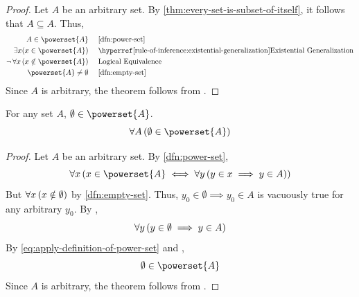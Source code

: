 \begin{proof}
    Let \( A \) be an arbitrary set. By \cref{thm:every-set-is-subset-of-itself}, it follows that
    \( A \subseteq A \). Thus,
    \begin{equation*}
        \begin{aligned}
            A \in \powerset{A}& \\
            \exists x ( x \in \powerset{A} )& \\
            \lnot \, \forall x \, ( x \notin \powerset{A} )&\\
            \powerset{A} \neq \emptyset&
        \end{aligned}
        \text{  }
        \begin{aligned}
            &\quad\text{\cref{dfn:power-set}}\\
            &\quad\text{\aref{rule-of-inference:existential-generalization}{Existential Generalization}}\\
            &\quad\text{Logical Equivalence}\\
            &\quad\text{\cref{dfn:empty-set}}\\
        \end{aligned}
    \end{equation*}
    Since \( A \) is arbitrary, the theorem follows from .
\end{proof}

\begin{thm}
    \label{thm:empty-set-belongs-to-the-powerset-of-any-set}
    For any set \( A \), \( \emptyset \in \powerset{A} \).
    \begin{equation*}
        \forall A \, \mleft( \emptyset \in \powerset{A} \mright)
    \end{equation*}
\end{thm}

\begin{proof}
    Let \( A \) be an arbitrary set. By \cref{dfn:power-set},
    \begin{equation}
        \label{eq:apply-definition-of-power-set}
        \forall x \, \mleft( x \in \powerset{A} \iff
        \forall y \, \mleft( y \in x \implies y \in A \mright) \mright)
    \end{equation}
    But \( \forall x \, \mleft( x \notin \emptyset \mright) \) by
    \cref{dfn:empty-set}. Thus, \( y_{0} \in \emptyset \implies y_{0} \in A \)
    is vacuously true for any arbitrary \( y_{0} \).
    By ,
    \begin{equation*}
        \forall y \, \mleft( y \in \emptyset \implies y \in A \mright)
    \end{equation*}
    By \eqref{eq:apply-definition-of-power-set} and ,
    \begin{equation*}
        \emptyset \in \powerset{A}
    \end{equation*}
    Since \( A \) is arbitrary, the theorem follows from .
\end{proof}

